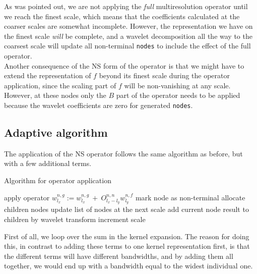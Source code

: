 \noindent
As was pointed out, we are not applying the \emph{full} multiresolution
operator until we reach the finest scale, which means that the coefficients
calculated at the coarser scales are somewhat incomplete. However, the
representation we have on the finest scale \emph{will} be complete, and a 
wavelet decomposition all the way to the coarsest scale will update all 
non-terminal \texttt{nodes} to include the effect of the full operator.\\

\noindent
Another consequence of the NS form of the operator is that we might have to
extend the representation of $f$ beyond its finest scale during the operator
application, since the scaling part of $f$ will be non-vanishing at any
scale. However, at these nodes only the $B$ part of the operator needs to be
applied because the wavelet coefficients are zero for generated \texttt{nodes}.

\subsection*{Adaptive algorithm}
The application of the NS operator follows the same algorithm as before, but
with a few additional terms. 
\begin{algorithm}
	\label{alg:operator}
	\caption{Algorithm for operator application}
	\begin{algorithmic}[1]
					\STATE apply operator $w_{l_x}^{n,g} := w_{l_x}^{n,g}\ +\
					O^{n,n}_{l_x-l_y}w^{n,f}_{l_y}$
					\ENDIF
					\ENDFOR
				\ENDFOR
					\STATE mark node as non-terminal
					\STATE allocate children nodes
					\STATE update list of nodes at the next scale
					\STATE add current node result to children by wavelet
					transform
					\ENDIF
				\ENDFOR
				\STATE increment scale
			\ENDWHILE
		\ENDFOR
	\end{algorithmic}
\end{algorithm}
\noindent
First of all, we loop over the sum in the kernel
expansion. The reason for doing this, in contrast to adding these terms to
one kernel representation first, is that the different terms will have
different bandwidths, and by adding them all together, we would end up with a
bandwidth equal to the widest individual one.\\

